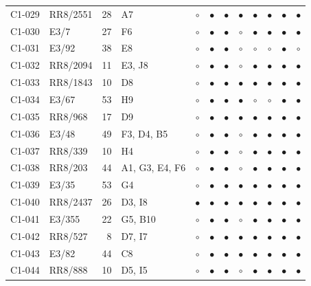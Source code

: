 {\begin{longtable}{llrp{3.9cm}cccccccc}
    C1-029 & RR8/2551 & 28 & A7 & $\circ$ & $\bullet$ & $\bullet$ & $\bullet$ & $\bullet$ & $\bullet$ & $\bullet$ & $\bullet$ \\
    C1-030 & E3/7 & 27 & F6 & $\circ$ & $\bullet$ & $\bullet$ & $\circ$ & $\bullet$ & $\bullet$ & $\bullet$ & $\bullet$ \\
    C1-031 & E3/92 & 38 & E8 & $\circ$ & $\bullet$ & $\bullet$ & $\circ$ & $\circ$ & $\circ$ & $\bullet$ & $\circ$ \\
    C1-032 & RR8/2094 & 11 & E3, J8 & $\circ$ & $\bullet$ & $\bullet$ & $\circ$ & $\bullet$ & $\bullet$ & $\bullet$ & $\bullet$ \\
    C1-033 & RR8/1843 & 10 & D8 & $\circ$ & $\bullet$ & $\bullet$ & $\bullet$ & $\bullet$ & $\bullet$ & $\bullet$ & $\bullet$ \\
    C1-034 & E3/67 & 53 & H9 & $\circ$ & $\bullet$ & $\bullet$ & $\bullet$ & $\circ$ & $\circ$ & $\bullet$ & $\bullet$ \\
    C1-035 & RR8/968 & 17 & D9 & $\circ$ & $\bullet$ & $\bullet$ & $\bullet$ & $\bullet$ & $\bullet$ & $\bullet$ & $\bullet$ \\
    C1-036 & E3/48 & 49 & F3, D4, B5 & $\circ$ & $\bullet$ & $\bullet$ & $\circ$ & $\bullet$ & $\bullet$ & $\bullet$ & $\bullet$ \\
    C1-037 & RR8/339 & 10 & H4 & $\circ$ & $\bullet$ & $\bullet$ & $\circ$ & $\bullet$ & $\bullet$ & $\bullet$ & $\bullet$ \\
    C1-038 & RR8/203 & 44 & A1, G3, E4, F6 & $\circ$ & $\bullet$ & $\bullet$ & $\circ$ & $\bullet$ & $\bullet$ & $\bullet$ & $\bullet$ \\
    C1-039 & E3/35 & 53 & G4 & $\circ$ & $\bullet$ & $\bullet$ & $\bullet$ & $\bullet$ & $\bullet$ & $\bullet$ & $\bullet$ \\
    C1-040 & RR8/2437 & 26 & D3, I8 & $\bullet$ & $\bullet$ & $\bullet$ & $\bullet$ & $\bullet$ & $\bullet$ & $\bullet$ & $\bullet$ \\
    C1-041 & E3/355 & 22 & G5, B10 & $\circ$ & $\bullet$ & $\bullet$ & $\circ$ & $\bullet$ & $\bullet$ & $\bullet$ & $\bullet$ \\
    C1-042 & RR8/527 & 8 & D7, I7 & $\circ$ & $\bullet$ & $\bullet$ & $\bullet$ & $\bullet$ & $\bullet$ & $\bullet$ & $\bullet$ \\
    C1-043 & E3/82 & 44 & C8 & $\circ$ & $\bullet$ & $\bullet$ & $\bullet$ & $\bullet$ & $\bullet$ & $\bullet$ & $\bullet$ \\
    C1-044 & RR8/888 & 10 & D5, I5 & $\circ$ & $\bullet$ & $\bullet$ & $\circ$ & $\bullet$ & $\bullet$ & $\bullet$ & $\bullet$ \\

\end{longtable}}

